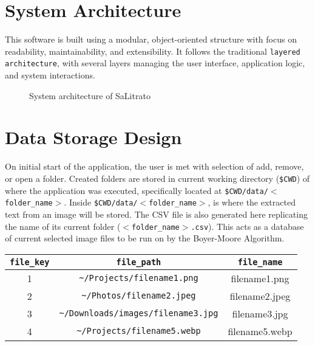 \section*{System Architecture}

\hspace\parindent
This software is built using a modular, object-oriented structure with focus on readability,
maintainability, and extensibility. It follows the traditional \texttt{layered architecture}, with
several layers managing the user interface, application logic, and system interactions.

\begin{figure}[hbt!]
    \center
    \noindent{}
    \caption{System architecture of SaLitrato}
    \label{fig:plannedUI}
\end{figure}

\section*{Data Storage Design}

\hspace\parindent
On initial start of the application, the user is met with selection of add, remove, or open a
folder. Created folders are stored in current working directory (\texttt{\$CWD}) of where 
the application was executed, specifically located at \texttt{\$CWD/data/$<$folder\_name$>$}.
Inside \texttt{\$CWD/data/$<$folder\_name$>$}, is where the extracted text from an image will be
stored. The CSV file is also generated here replicating the name of its current folder 
(\texttt{$<$folder\_name$>$.csv}). This acts as a database of current selected image files to 
be run on by the Boyer-Moore Algorithm.

\begin{center}
\begin{tabular}{| c | c | c |}
    \hline
    \texttt{file\_key} & \texttt{file\_path} & \texttt{file\_name}\\
    \hline
    1 & \texttt{\textasciitilde/Projects/filename1.png} & filename1.png\\
    \hline
    2 & \texttt{\textasciitilde/Photos/filename2.jpeg} & filename2.jpeg\\
    \hline
    3 & \texttt{\textasciitilde/Downloads/images/filename3.jpg} & filename3.jpg\\
    \hline
    4 & \texttt{\textasciitilde/Projects/filename5.webp} & filename5.webp\\
    \hline
\end{tabular}
\end{center}

